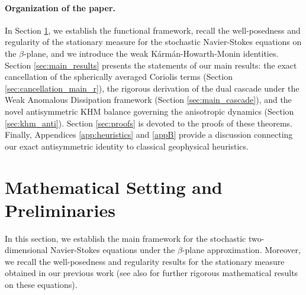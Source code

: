 \documentclass[11pt,a4paper]{article}
\numberwithin{equation}{section}
\numberwithin{theorem}{section}
\numberwithin{remark}{section}
\numberwithin{definition}{section}
\begin{document}
\paragraph{Organization of the paper.}
In Section \ref{sec:setting}, we establish the functional framework, recall the well-posedness and regularity of the stationary measure for the stochastic Navier-Stokes equations on the $\beta$-plane, and we introduce the weak Kármán-Howarth-Monin identities. Section \ref{sec:main_results} presents the statements of our main results: the exact cancellation of the spherically averaged Coriolis terms (Section \ref{sec:cancellation_main_r}), the rigorous derivation of the dual cascade under the Weak Anomalous Dissipation framework (Section \ref{sec:main_cascade}), and the novel antisymmetric KHM balance governing the anisotropic dynamics (Section \ref{sec:khm_anti}). Section \ref{sec:proofs} is devoted to the proofs of these theorems. Finally, Appendices \ref{app:heuristics} and \ref{appB} provide a discussion connecting our exact antisymmetric identity to classical geophysical heuristics.





\section{Mathematical Setting and Preliminaries}\label{sec:setting}

In this section, we establish the main framework for the stochastic two-dimensional Navier-Stokes equations under the $\beta$-plane approximation. Moreover, we recall the well-posedness and regularity results for the stationary measure obtained in our previous work \cite{yuriamiraligigliolaWP} (see also \cite{mustafa, Yuri, gallagher2, gallagher1} for further rigorous mathematical results on these equations).
\end{document}
